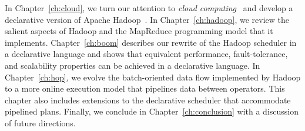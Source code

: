 In Chapter~\ref{ch:cloud}, we turn our attention to {\em cloud
computing}~\cite{abovetheclouds} and develop a declarative version of Apache
Hadoop~\cite{hadoop}.  In Chapter~\ref{ch:hadoop}, we review the salient
aspects of Hadoop and the MapReduce programming model that it implements.
Chapter~\ref{ch:boom} describes our rewrite of the Hadoop scheduler in a
declarative language and shows that equivalent performance, fault-tolerance,
and scalability properties can be achieved in a declarative language.  In
Chapter~\ref{ch:hop}, we evolve the batch-oriented data flow implemented by
Hadoop to a more online execution model that pipelines data between operators.
This chapter also includes extensions to the declarative scheduler that
accommodate pipelined plans.  Finally, we conclude in
Chapter~\ref{ch:conclusion} with a discussion of future directions.






